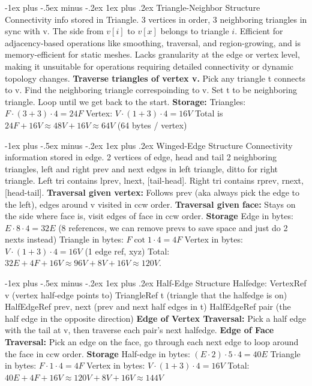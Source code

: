 \documentclass[letterpaper, 8pt]{extarticle}
\makeatletter
\renewcommand{\subsubsection}{\@startsection{subsubsection}{3}{0mm}%
                                {-1ex plus -.5ex minus -.2ex}%
                                {1ex plus .2ex}%
                                {\normalfont\tiny\bfseries\itshape}}
\makeatother
\begin{document}
\begin{multicols*}{4}
\subsubsection{Triangle-Neighbor Structure}
Connectivity info stored in Triangle.
3 vertices in order, 3 neighboring triangles in sync with v.
The side from $v[i]$ to $v[x]$ belongs to triangle $i$.
Efficient for adjacency-based operations like smoothing, traversal, and region-growing,
and is memory-efficient for static meshes.
Lacks granularity at the edge or vertex level,
making it unsuitable for operations requiring detailed connectivity or dynamic topology changes.
\textbf{Traverse triangles of vertex v.}
Pick any triangle t connects to v.
Find the neighboring triangle correspoinding to v.
Set t to be neighboring triangle.
Loop until we get back to the start.
\textbf{Storage:}
Triangles: $F \cdot (3 + 3) \cdot 4 = 24F$
Vertex: $V \cdot (1 + 3) \cdot 4 = 16V$
Total is $24F + 16V \approx 48V + 16V \approx 64V$ (64 bytes / vertex)

\subsubsection{Winged-Edge Structure}
Connectivity information stored in edge.
2 vertices of edge, head and tail
2 neighboring triangles, left and right
prev and next edges in left triangle,
ditto for right triangle.
Left tri contains lprev, lnext, [tail-head].
Right tri contains rprev, rnext, [head-tail].
\textbf{Traversal given vertex:}
Follows prev (aka always pick the edge to the left),
edges around v visited in ccw order.
\textbf{Traversal given face:}
Stays on the side where face is,
visit edges of face in ccw order.
\textbf{Storage}
Edge in bytes: $E \cdot 8 \cdot 4 = 32E$ (8 references, we can remove prevs to save space and just do 2 nexts instead)
Triangle in bytes: $F \cot 1 \cdot 4 = 4F$
Vertex in bytes: $V \cdot (1 + 3) \cdot 4 = 16V$ (1 edge ref, xyz)
Total: $32E + 4F + 16V \approx 96V + 8V + 16V \approx 120V$.

\subsubsection{Half-Edge Structure}
Halfedge:
VertexRef v (vertex half-edge points to)
TriangleRef t (triangle that the halfedge is on)
HalfEdgeRef prev, next (prev and next half edges in t)
HalfEdgeRef pair (the half edge in the opposite direction)
\textbf{Edge of Vertex Traversal:}
Pick a half edge with the tail at v,
then traverse each pair's next halfedge.
\textbf{Edge of Face Traversal:}
Pick an edge on the face, go through each next edge to loop around the face in ccw order.
\textbf{Storage}
Half-edge in bytes: $(E \cdot 2) \cdot 5 \cdot 4 = 40E$
Triangle in bytes: $F \cdot 1 \cdot 4 = 4F$
Vertex in bytes: $V \cdot (1 + 3) \cdot 4 = 16V$
Total: $40E + 4F + 16V \approx 120V + 8V + 16V \approx 144V$


\end{multicols*}
\end{document}
